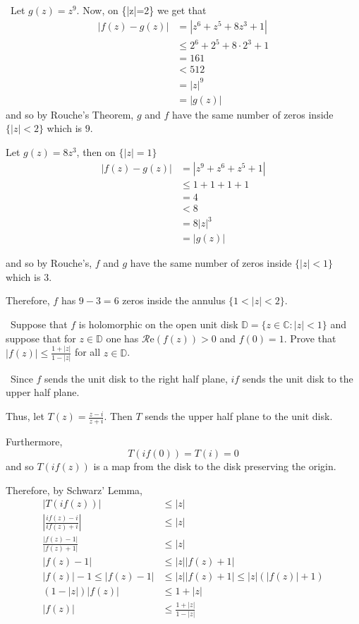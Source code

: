 \documentclass[12pt]{Homework}
\newcommand{\re}{\mathscr{R}\text{e}}
\begin{document}
\begin{solution}$\,$
Let $g(z)=z^9$. Now, on \{|z|=2\} we get that \begin{align*}
    |f(z)-g(z)|&=|z^6+z^5+8z^3+1|\\
    &\le 2^6+2^5+8\cdot 2^3+1\\
    &=161\\
    &<512\\
    &=|z|^9\\
    &=|g(z)|
\end{align*} and so by Rouche's Theorem, $g$ and $f$ have the same number of zeros inside $\{|z|<2\}$ which is $9$.

Let $g(z)=8z^3$, then on $\{|z|=1\}$ \begin{align*}
    |f(z)-g(z)|&=|z^9+z^6+z^5+1|\\
    &\le 1+1+1+1\\
    &=4\\
    &<8\\
    &=8|z|^3\\
    &=|g(z)|
\end{align*} 

and so by Rouche's, $f$ and $g$ have the same number of zeros inside $\{|z|<1\}$ which is $3.$

Therefore, $f$ has $9-3=6$ zeros inside the annulus $\{1<|z|<2\}.$
\end{solution}
\newpage




\begin{problem} $\,$
Suppose that $f$ is holomorphic on the open unit disk $\mathbb{D}=\{z\in\mathbb{C}:|z|<1\}$ and suppose that for $z\in\mathbb{D}$ one has $\re(f(z))>0$ and $f(0)=1.$ Prove that $|f(z)|\le\frac{1+|z|}{1-|z|}$ for all $z\in\mathbb{D}$.
\end{problem}


\begin{solution}$\,$
Since $f$ sends the unit disk to the right half plane, $if$ sends the unit disk to the upper half plane.

Thus, let $T(z)=\frac{z-i}{z+i}$. Then $T$ sends the upper half plane to the unit disk. 

Furthermore, $$T(if(0))=T(i)=0$$ and so $T(if(z))$ is a map from the disk to the disk preserving the origin.

Therefore, by Schwarz' Lemma, \begin{align*}
    |T(if(z))|&\le|z|\\
    \left|\frac{if(z)-i}{if(z)+i}\right|&\le|z|\\
    \frac{|f(z)-1|}{|f(z)+1|}&\le |z|\\
    |f(z)-1|&\le |z||f(z)+1|\\
    |f(z)|-1\le |f(z)-1|&\le |z||f(z)+1|\le |z|(|f(z)|+1)\\
    (1-|z|)|f(z)|&\le 1+|z|\\
    |f(z)|&\le\frac{1+|z|}{1-|z|}
\end{align*}
\end{solution}
\newpage
\end{document}
